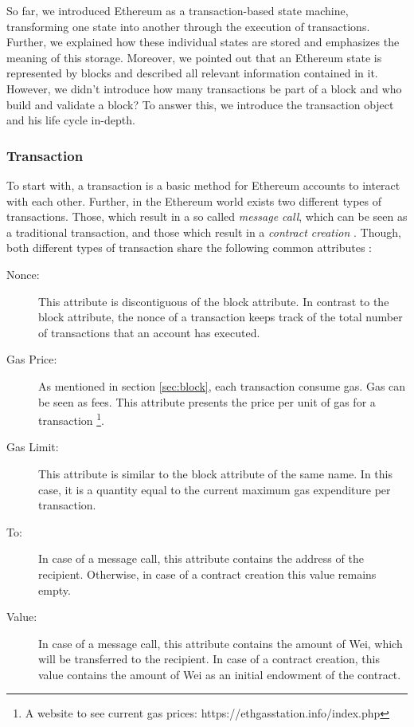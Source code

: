 So far, we introduced Ethereum as a transaction-based state machine, transforming 
one state into another through the execution of transactions. Further, we explained 
how these individual states are stored and emphasizes the meaning of this storage. 
Moreover, we pointed out that an Ethereum state is represented by blocks and described 
all relevant information contained in it.
However, we didn't introduce how many transactions be part 
of a block and who build and validate a block? To answer this, 
we introduce the transaction object and his life cycle in-depth.


\subsubsection{Transaction}
\label{sec:transaction}
To start with, a transaction is a basic method for Ethereum accounts to interact with each other. 
Further, in the Ethereum world exists two different types of transactions. 
Those, which result in a so called \textit{message call}, which can be seen as a 
traditional transaction, and those which result in a \textit{contract creation} . 
Though, both different types of transaction share the following common attributes :

\begin{description}
	\item[Nonce: ] This attribute is discontiguous of the block attribute. In contrast to the block attribute, the nonce of a transaction keeps track of the total number of transactions that an account has executed. 
	\item[Gas Price: ] As mentioned in section \ref{sec:block}, each transaction consume gas. Gas can be seen as fees. This attribute presents the price per unit of gas for a transaction \footnote{A website to see current gas prices: https://ethgasstation.info/index.php}. 
	\item[Gas Limit: ] This attribute is similar to the block attribute of the same name. In this case, it is a quantity equal to the current maximum gas expenditure per transaction.  
	\item[To: ] In case of a message call, this attribute contains the address of the recipient. Otherwise, in case of a contract creation this value remains empty. 
	\item[Value: ] In case of a message call, this attribute contains the amount of Wei, which will be transferred to the recipient. In case of a contract creation, this value contains the amount of Wei as an initial endowment of the contract.
\end{description}

